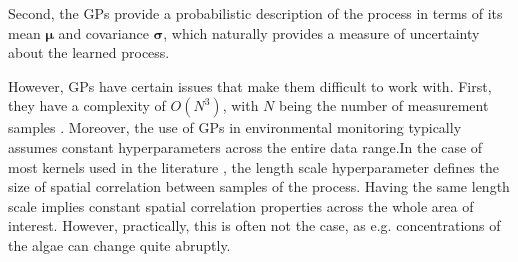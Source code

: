 \documentclass[journal]{IEEEtran}
\newcommand\vect[1]{\boldsymbol{#1}}
\begin{document}

Second, the GPs provide a probabilistic description of the process in terms of its mean $\vect{\mu}$ and covariance $\vect{\sigma}$, which naturally provides a measure of uncertainty about the learned process.


However, GPs have certain issues that make them difficult to work with. First, they have a complexity of $O(N^3)$, with $N$ being the number of measurement samples \cite{RasmussenBible}. Moreover, the use of GPs in environmental monitoring typically assumes constant hyperparameters across the entire data range.In the case of most kernels used in the literature \cite{peralta_MULTIOBJECTIVE}, the length scale hyperparameter defines the size of spatial correlation between samples of the process. 
Having the same length scale implies constant spatial correlation properties across the whole area of interest. However, practically, this is often not the case, as e.g. concentrations of the algae can change quite abruptly. 
\end{document}
